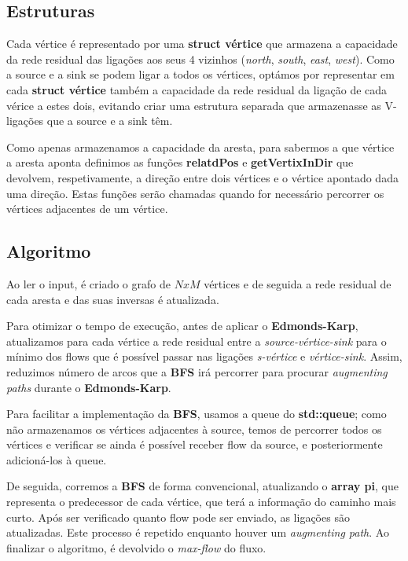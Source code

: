 \documentclass[12pt,a4paper]{article}
\begin{document}
\subsection{Estruturas}
Cada vértice é representado por uma \textbf{struct vértice} que armazena a capacidade da rede residual das ligações aos seus
4 vizinhos (\textit{north}, \textit{south}, \textit{east}, \textit{west}). Como a source e a sink se podem ligar a todos os vértices,
optámos por representar
em cada \textbf{struct vértice} também a capacidade da rede residual da ligação de cada vérice a estes dois, evitando criar
uma estrutura separada que armazenasse as V-ligações que a source e a sink têm.

Como apenas armazenamos a capacidade da aresta, para sabermos a que vértice a aresta aponta definimos as funções
\textbf{relatdPos} e \textbf{getVertixInDir} que devolvem, respetivamente, a direção entre dois vértices e o vértice apontado
dada uma direção. Estas funções serão chamadas quando for necessário percorrer os vértices adjacentes de um vértice.

\subsection{Algoritmo}
Ao ler o input, é criado o grafo de $NxM$ vértices e de seguida a rede residual de cada aresta e das suas inversas é atualizada.

Para otimizar o tempo de execução, antes de aplicar o \textbf{Edmonds-Karp}, atualizamos para cada vértice a rede residual entre a
\textit{source-vértice-sink} para o mínimo dos flows que é possível passar nas ligações \textit{s-vértice} e \textit{vértice-sink}.
Assim, reduzimos número de arcos que a \textbf{BFS} irá percorrer para procurar \textit{augmenting paths} durante o \textbf{Edmonds-Karp}.

Para facilitar a implementação da \textbf{BFS}, usamos a queue do \textbf{std::queue}; como não armazenamos os vértices adjacentes à source,
temos de percorrer todos os vértices e verificar se ainda é possível receber flow da source, e posteriormente adicioná-los
à queue.

De seguida, corremos a \textbf{BFS} de forma convencional, atualizando o \textbf{array pi}, que representa o predecessor
de cada vértice, que terá a informação do caminho mais curto. Após ser verificado quanto flow pode ser enviado, as ligações
são atualizadas. Este processo é repetido enquanto houver um \textit{augmenting path}. Ao finalizar o algoritmo, é devolvido o \textit{max-flow} do fluxo.
\end{document}
